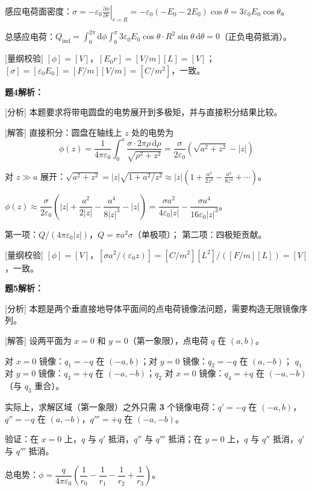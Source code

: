 \documentclass[11pt,a4paper,openany,oneside]{book}
\newcommand{\diff}{\mathrm{d}}
\newcommand{\eps}{\varepsilon}
\begin{document}
感应电荷面密度：$\sigma = -\eps_0\left.\frac{\partial\phi}{\partial r}\right|_{r=R} = -\eps_0\left(-E_0 - 2E_0\right)\cos\theta = 3\eps_0 E_0\cos\theta$。

总感应电荷：$Q_{\text{ind}} = \int_0^{2\pi}\diff\phi\int_0^\pi 3\eps_0 E_0\cos\theta \cdot R^2\sin\theta\,\diff\theta = 0$（正负电荷抵消）。\qedsymbol

[量纲校验] $[\phi] = [V]$，$[E_0 r] = [V/m][L] = [V]$；$[\sigma] = [\eps_0 E_0] = [F/m][V/m] = [C/m^2]$，一致。\qedsymbol

\textbf{题4解析：}

[分析] 本题要求将带电圆盘的电势展开到多极矩，并与直接积分结果比较。

[解答] 直接积分：圆盘在轴线上 $z$ 处的电势为
\[
\phi(z) = \frac{1}{4\pi\eps_0}\int_0^a \frac{\sigma \cdot 2\pi\rho\,\diff\rho}{\sqrt{\rho^2+z^2}} = \frac{\sigma}{2\eps_0}\left(\sqrt{a^2+z^2} - |z|\right)
\]

对 $z \gg a$ 展开：$\sqrt{a^2+z^2} = |z|\sqrt{1+a^2/z^2} \approx |z|\left(1 + \frac{a^2}{2z^2} - \frac{a^4}{8z^4} + \cdots\right)$。

$\phi(z) \approx \dfrac{\sigma}{2\eps_0}\left(|z| + \dfrac{a^2}{2|z|} - \dfrac{a^4}{8|z|^3} - |z|\right) = \dfrac{\sigma a^2}{4\eps_0|z|} - \dfrac{\sigma a^4}{16\eps_0|z|^3}$。

第一项：$Q/(4\pi\eps_0|z|)$，$Q = \pi a^2\sigma$（单极项）；
第二项：四极矩贡献。\qedsymbol

[量纲校验] $[\phi] = [V]$，$[\sigma a^2/(\eps_0 z)] = [C/m^2][L^2]/([F/m][L]) = [V]$，一致。\qedsymbol

\textbf{题5解析：}

[分析] 本题是两个垂直接地导体平面间的点电荷镜像法问题，需要构造无限镜像序列。

[解答] 设两平面为 $x=0$ 和 $y=0$（第一象限），点电荷 $q$ 在 $(a,b)$。

对 $x=0$ 镜像：$q_1 = -q$ 在 $(-a,b)$；对 $y=0$ 镜像：$q_2 = -q$ 在 $(a,-b)$；
$q_1$ 对 $y=0$ 镜像：$q_3 = +q$ 在 $(-a,-b)$；$q_2$ 对 $x=0$ 镜像：$q_4 = +q$ 在 $(-a,-b)$（与 $q_3$ 重合）。

实际上，求解区域（第一象限）之外只需 \textbf{3} 个镜像电荷：$q' = -q$ 在 $(-a,b)$，$q'' = -q$ 在 $(a,-b)$，$q''' = +q$ 在 $(-a,-b)$。

验证：在 $x=0$ 上，$q$ 与 $q'$ 抵消，$q''$ 与 $q'''$ 抵消；在 $y=0$ 上，$q$ 与 $q''$ 抵消，$q'$ 与 $q'''$ 抵消。

总电势：$\phi = \dfrac{q}{4\pi\eps_0}\left(\dfrac{1}{r_0} - \dfrac{1}{r_1} - \dfrac{1}{r_2} + \dfrac{1}{r_3}\right)$。\qedsymbol
\end{document}
